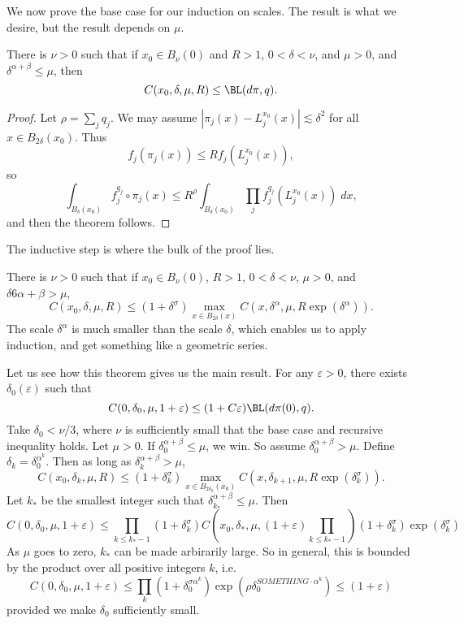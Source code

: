 We now prove the base case for our induction on scales. The result is what we desire, but the result depends on $\mu$.

\begin{theorem}
    There is $\nu > 0$ such that if $x_0 \in B_\nu(0)$ and $R > 1$, $0 < \delta < \nu$, and $\mu > 0$, and $\delta^{\alpha + \beta} \leq \mu$, then
    \[ C(x_0,\delta,\mu,R) \leq \BL(d\pi, q). \]
\end{theorem}
\begin{proof}
    Let $\rho = \sum_j q_j$. We may assume $|\pi_j(x) - L_j^{x_0}(x)| \lesssim \delta^2$ for all $x \in B_{2\delta}(x_0)$. Thus
    \[ f_j(\pi_j(x)) \leq R f_j(L_j^{x_0}(x)), \]
    so
    \[ \int_{B_\delta(x_0)} f_j^{q_j} \circ \pi_j(x) \leq R^\rho \int_{B_\delta(x_0)} \prod_j f_j^{q_j}(L_j^{x_0}(x))\; dx, \]
    and then the theorem follows.
\end{proof}

The inductive step is where the bulk of the proof lies.

\begin{theorem}
    There is $\nu > 0$ such that if $x_0 \in B_\nu(0)$, $R > 1$, $0 < \delta < \nu$, $\mu > 0$, and $\delta6{\alpha + \beta} > \mu$,
    \[ C(x_0,\delta,\mu, R) \leq (1 + \delta^\sigma) \max_{x \in B_{2 \delta}(x)} C(x, \delta^\alpha, \mu, R \exp(\delta^\alpha)). \]
    The scale $\delta^\alpha$ is much smaller than the scale $\delta$, which enables us to apply induction, and get something like a geometric series.
\end{theorem}

Let us see how this theorem gives us the main result. For any $\varepsilon > 0$, there exists $\delta_0(\varepsilon)$ such that
%
\[ C(0,\delta_0,\mu,1 + \varepsilon) \leq (1 + C \varepsilon) \BL(d\pi(0), q). \]
%
Take $\delta_0 < \nu / 3$, where $\nu$ is sufficiently small that the base case and recursive inequality holds. Let $\mu > 0$. If $\delta_0^{\alpha + \beta} \leq \mu$, we win. So assume $\delta_0^{\alpha + \beta} > \mu$. Define $\delta_k = \delta_0^{\alpha^k}$. Then as long as $\delta_k^{\alpha + \beta} > \mu$,
%
\[ C(x_0,\delta_k,\mu,R) \leq (1 + \delta_k^\sigma) \max_{x \in B_{2 \delta_k}(x_0)} C(x, \delta_{k+1}, \mu, R \exp(\delta_k^\sigma)). \]
%
Let $k_*$ be the smallest integer such that $\delta_{k_*}^{\alpha + \beta} \leq \mu$. Then
%
\[ C(0,\delta_0, \mu, 1 + \varepsilon) \leq \prod_{k \leq k_* - 1} (1 + \delta_k^\sigma) C(x_0,\delta_*, \mu, (1 + \varepsilon) \prod_{k \leq k_* - 1})  (1 + \delta_k^\sigma) \exp(\delta_k^\sigma) \]
As $\mu$ goes to zero, $k_*$ can be made arbirarily large. So in general, this is bounded by the product over all positive integers $k$, i.e.
%
\[ C(0,\delta_0, \mu, 1 + \varepsilon) \leq \prod_k (1 + \delta_0^{\sigma \alpha^k}) \exp( \rho \delta_0^{SOMETHING \cdot \alpha^k }) \leq (1 + \varepsilon) \]
%
provided we make $\delta_0$ sufficiently small.

